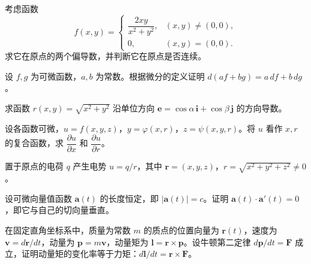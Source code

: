 \noindent\begin{minipage}{\textwidth}
考虑函数 \[f(x,y)=\begin{cases}\dfrac{2xy}{x^2+y^2},&(x,y)\ne(0,0),\\0,&(x,y)=(0,0).\end{cases}\] 求它在原点的两个偏导数，并判断它在原点是否连续。
\end{minipage}\par\vfill
\newpage
\noindent\begin{minipage}{\textwidth}
设 $f,g$ 为可微函数，$a,b$ 为常数。根据微分的定义证明 $d(af+bg)=a\,df+b\,dg$。
\end{minipage}\par\vfill
\noindent\begin{minipage}{\textwidth}
求函数 $r(x,y)=\sqrt{x^2+y^2}$ 沿单位方向 $\boldsymbol e=\cos\alpha\,\boldsymbol i+\cos\beta\,\boldsymbol j$ 的方向导数。
\end{minipage}\par\vfill
\noindent\begin{minipage}{\textwidth}
设各函数可微，$u=f(x,y,z)$，$y=\varphi(x,r)$，$z=\psi(x,y,r)$。将 $u$ 看作 $x,r$ 的复合函数，求 $\dfrac{\partial u}{\partial x}$ 和 $\dfrac{\partial u}{\partial r}$。
\end{minipage}\par\vfill
\noindent\begin{minipage}{\textwidth}
置于原点的电荷 $q$ 产生电势 $u=q/r$，其中 $\boldsymbol r=(x,y,z)$，$r=\sqrt{x^2+y^2+z^2}\ne0$。
\end{minipage}\par\vfill
\newpage
\noindent\begin{minipage}{\textwidth}
设可微向量值函数 $\boldsymbol a(t)$ 的长度恒定，即 $|\boldsymbol a(t)|=c$。证明 $\boldsymbol a(t)\cdot\boldsymbol a'(t)=0$，即它与自己的切向量垂直。
\end{minipage}\par\vfill
\noindent\begin{minipage}{\textwidth}
在固定直角坐标系中，质量为常数 $m$ 的质点的位置向量为 $\boldsymbol r(t)$，速度为 $\boldsymbol v=d\boldsymbol r/dt$，动量为 $\boldsymbol p=m\boldsymbol v$，动量矩为 $\boldsymbol l=\boldsymbol r\times\boldsymbol p$。设牛顿第二定律 $d\boldsymbol p/dt=\boldsymbol F$ 成立，证明动量矩的变化率等于力矩：$d\boldsymbol l/dt=\boldsymbol r\times\boldsymbol F$。
\end{minipage}\par\vfill

